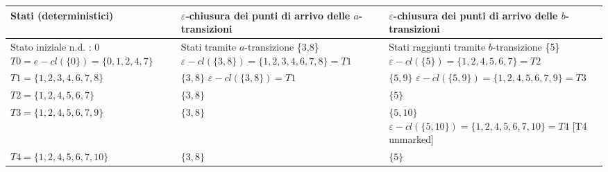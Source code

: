 \documentclass{standalone}
\providecommand\lightrule{%
	\arrayrulecolor{black!30}%
	\midrule[\lightrulewidth]%
	\arrayrulecolor{black}}
\begin{document}
\begin{tabularx}{\textwidth}{XXX}
		Stati (deterministici) & \(\varepsilon\)-chiusura dei punti di arrivo delle \(a\)-transizioni & \(\varepsilon\)-chiusura dei punti di arrivo delle \(b\)-transizioni \\
    \midrule
        Stato iniziale n.d. : 0 \newline
        \(T0 = e-cl(\{0\}) = \{0, 1, 2, 4, 7\}\)
        &
        Stati tramite \(a\)-transizione \{3,8\} \newline
        \(\varepsilon-cl(\{3,8\}) = \{1,2,3,4,6,7,8\} = T1\) \newline
        [T1 unmarked]
        &
        Stati raggiunti tramite \(b\)-transizione \{5\} \newline
        \(\varepsilon-cl(\{5\}) = \{1,2,4,5,6,7\} = T2\) \newline
        [T2 unmarked]
        \\ \lightrule
        \(T1 = \{1,2,3,4,6,7,8\}\)
        &
        \(\{3, 8\}\) \newline
        \(\varepsilon-cl(\{3,8\}) = T1\) 
        &
        \(\{5, 9\}\) \newline
        \(\varepsilon-cl(\{5,9\}) = \{1,2,4,5,6,7,9\} = T3\) \newline
        [T3 unmarked]
        \\ \lightrule
        \(T2 = \{1,2,4,5,6,7\}\)
        &
        \(\{3,8\}\) 
        &
        \(\{5\}\) 
        \\ \lightrule
        \(T3 = \{1,2,4,5,6,7,9\}\)
        &
        \(\{3,8\}\) 
        &
        \(\{5, 10\}\) \newline
        \(\varepsilon-cl(\{5, 10\}) = \{1,2,4,5,6,7,10\} = T4\)
        [T4 unmarked]
        \\ \lightrule
        \(T4 = \{1,2,4,5,6,7,10\}\)
        &
        \(\{3,8\}\) 
        &
        \(\{5\}\) 
        \\
\end{tabularx}
\end{document}
